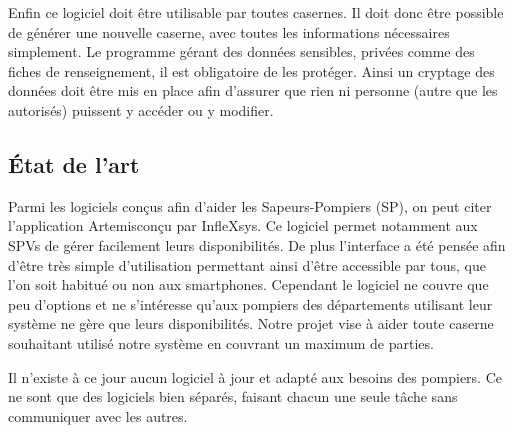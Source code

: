 Enfin ce logiciel doit être utilisable par toutes casernes. Il doit donc être possible de générer une nouvelle caserne, avec toutes les informations nécessaires simplement. Le programme gérant des données sensibles, privées comme des fiches de renseignement, il est obligatoire de les protéger. Ainsi un cryptage des données doit être mis en place afin d'assurer que rien ni personne (autre que les autorisés) puissent y accéder ou y modifier.

\subsection{État de l'art}
Parmi les logiciels conçus afin d'aider les Sapeurs-Pompiers (SP), on peut citer l'application Artemis\footnotemark[1] conçu par InfleXsys. Ce logiciel permet notamment aux SPVs de gérer facilement leurs disponibilités. De plus l'interface a été pensée afin d'être très simple d'utilisation permettant ainsi d'être accessible par tous, que l'on soit habitué ou non aux smartphones. Cependant le logiciel ne couvre que peu d'options et ne s'intéresse qu'aux pompiers des départements utilisant leur système ne gère que leurs disponibilités. Notre projet vise à aider toute caserne souhaitant utilisé notre système en couvrant un maximum de parties.

Il n'existe à ce jour aucun logiciel à jour et adapté aux besoins des pompiers. Ce ne sont que des logiciels bien séparés, faisant chacun une seule tâche sans communiquer avec les autres.

